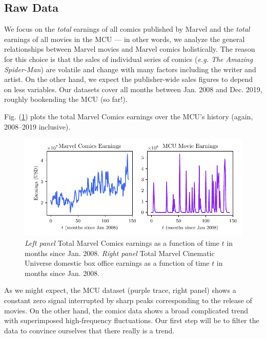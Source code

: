 \documentclass[12pt]{article}
\begin{document}
\subsection{Raw Data}
We focus on the \textit{total} earnings of all comics published by Marvel and the \textit{total} earnings of all movies in the MCU ---  in other words, we analyze the general relationships between Marvel movies and Marvel comics holistically.  The reason for this choice is that the sales of individual series of comics (\textit{e.g. The Amazing Spider-Man}) are volatile and change with many factors including the writer and artist. On the other hand, we expect the publisher-wide sales figures to depend on less variables.  Our datasets cover all months between Jan. 2008 and Dec. 2019, roughly bookending the MCU (so far!).

Fig. (\ref{fig:raw_data1}) plots the total Marvel Comics earnings over the MCU's history (again, 2008--2019 inclusive).
\begin{figure}[h]
    \centering
    \includegraphics{figures/raw_data1.pdf}
    \caption{\textit{Left panel} Total Marvel Comics earnings as a function of time $t$ in months since Jan. 2008.  \textit{Right panel} Total Marvel Cinematic Universe domestic box office earnings as a function of time $t$ in months since Jan. 2008.}\label{fig:raw_data1}
\end{figure}
As we might expect, the MCU dataset (purple trace, right panel) shows a constant zero signal interrupted by sharp peaks corresponding to the release of movies.  On the other hand, the comics data shows a broad complicated trend with superimposed high-frequency fluctuations.  Our first step will be to filter the data to convince ourselves that there really is a trend.
\end{document}
